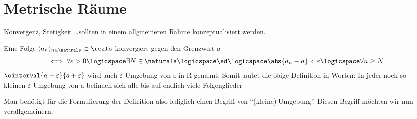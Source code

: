\chapter{Metrische Räume}
\begin{ziel*}
    Konvergenz, Stetigkeit \ldots sollten in einem allgmeineren Rahme konzeptualisiert werden.
\end{ziel*}
\begin{erinnerung*}
    Eine Folge \( (a_n)_{n\in \naturals}\subset \reals \) konvergiert gegen den Grenzwert \( a \)
    \begin{align*}
        \iff \forall \varepsilon>0 \logicspace\exists N\in \naturals\logicspace\sd\logicspace \abs{a_n-a}<\varepsilon\logicspace\forall n \geq N
    \end{align*}
    \( \ointerval{a-\varepsilon}{a+\varepsilon} \) wird auch \( \varepsilon \)-Umgebung von a in R genannt. 
    Somit lautet die obige Definition in Worten: 
    In jeder noch so kleinen \( \varepsilon \)-Umgebung von a befinden sich alle bis auf endlich viele Folgenglieder.    
\end{erinnerung*}
Man benötigt für die Formulierung der Definition also lediglich einen Begriff von \enquote{(kleine) Umgebung}. 
Diesen Begriff möchten wir nun verallgemeinern.
    
